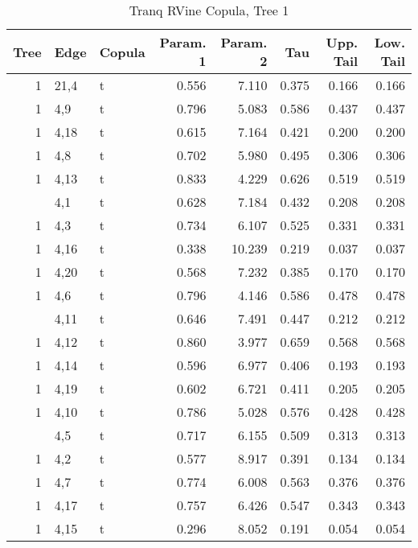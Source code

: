 \begin{table}

\caption{Tranq RVine Copula, Tree 1}
\centering
\begin{tabular}[t]{rllrrrrr}
\toprule
Tree & Edge & Copula & Param. 1 & Param. 2 & Tau & Upp. Tail & Low. Tail\\
\midrule
1 & 21,4 & t & 0.556 & 7.110 & 0.375 & 0.166 & 0.166\\
1 & 4,9 & t & 0.796 & 5.083 & 0.586 & 0.437 & 0.437\\
1 & 4,18 & t & 0.615 & 7.164 & 0.421 & 0.200 & 0.200\\
1 & 4,8 & t & 0.702 & 5.980 & 0.495 & 0.306 & 0.306\\
1 & 4,13 & t & 0.833 & 4.229 & 0.626 & 0.519 & 0.519\\
\addlinespace
1 & 4,1 & t & 0.628 & 7.184 & 0.432 & 0.208 & 0.208\\
1 & 4,3 & t & 0.734 & 6.107 & 0.525 & 0.331 & 0.331\\
1 & 4,16 & t & 0.338 & 10.239 & 0.219 & 0.037 & 0.037\\
1 & 4,20 & t & 0.568 & 7.232 & 0.385 & 0.170 & 0.170\\
1 & 4,6 & t & 0.796 & 4.146 & 0.586 & 0.478 & 0.478\\
\addlinespace
1 & 4,11 & t & 0.646 & 7.491 & 0.447 & 0.212 & 0.212\\
1 & 4,12 & t & 0.860 & 3.977 & 0.659 & 0.568 & 0.568\\
1 & 4,14 & t & 0.596 & 6.977 & 0.406 & 0.193 & 0.193\\
1 & 4,19 & t & 0.602 & 6.721 & 0.411 & 0.205 & 0.205\\
1 & 4,10 & t & 0.786 & 5.028 & 0.576 & 0.428 & 0.428\\
\addlinespace
1 & 4,5 & t & 0.717 & 6.155 & 0.509 & 0.313 & 0.313\\
1 & 4,2 & t & 0.577 & 8.917 & 0.391 & 0.134 & 0.134\\
1 & 4,7 & t & 0.774 & 6.008 & 0.563 & 0.376 & 0.376\\
1 & 4,17 & t & 0.757 & 6.426 & 0.547 & 0.343 & 0.343\\
1 & 4,15 & t & 0.296 & 8.052 & 0.191 & 0.054 & 0.054\\
\bottomrule
\end{tabular}
\end{table}
